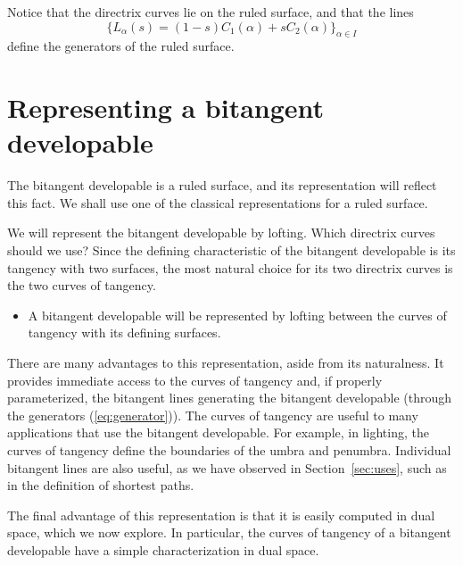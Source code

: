 \documentclass[12pt]{article}
\newif\ifJournal
\begin{document}
Notice that the directrix curves lie on the ruled surface,
and that the lines 
\begin{equation}
\label{eq:generator}
	\{ L_{\alpha}(s) = (1-s) C_1(\alpha) + s C_2(\alpha) \}_{\alpha \in I}
\end{equation}
define the generators of the ruled surface.

\ifJournal
\begin{example}
$(1-s)(\cos t, \sin t, 0) + s (\cos t, \sin t, 1)$ is a lofting between
two circles, defining a cylinder.
A typical generator is $(1-s)(1,0,0) + s(1,0,1)$.
\end{example}
\fi

\clearpage


\section{Representing a bitangent developable}
\label{sec:rep}

The bitangent developable is a ruled surface,
and its representation will reflect this fact.
We shall use one of the classical representations for a ruled surface.

We will represent the bitangent developable by lofting.
Which directrix curves should we use?
Since the defining characteristic of the bitangent developable is 
its tangency with two surfaces, 
the most natural choice for its two directrix curves is the two
curves of tangency.
%
\begin{itemize}
\item A bitangent developable will be represented by lofting between
      the curves of tangency with its defining surfaces.
\end{itemize}
%
There are many advantages to this representation, aside from its naturalness.
It provides immediate access to the curves of tangency and,
if properly parameterized, 
the bitangent lines generating the bitangent developable
(through the generators (\ref{eq:generator})).
The curves of tangency are useful to many
applications that use the bitangent developable.
For example, in lighting, the curves of tangency define the boundaries
of the umbra and penumbra.
Individual bitangent lines are also useful,
as we have observed in Section~\ref{sec:uses},
such as in the definition of shortest paths.

The final advantage of this representation is that it is
easily computed in dual space, which we now explore.
In particular, the curves of tangency of a bitangent developable
have a simple characterization in dual space.
\end{document}
